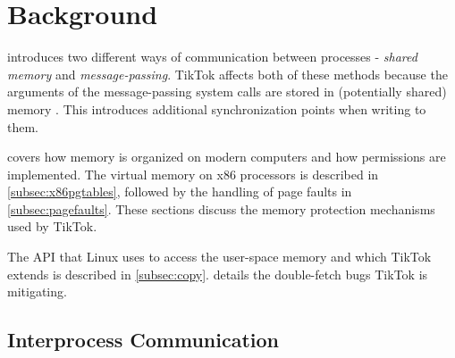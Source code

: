 \section{Background}
\label{sec:background}

 introduces two different ways of communication between
processes - \emph{shared memory} and \emph{message-passing}. TikTok affects both
of these methods because the arguments of the message-passing system calls are
stored in (potentially shared) memory . This introduces additional
synchronization points when writing to them. 

 covers how memory is organized on modern computers and how
permissions are implemented. The virtual memory on x86 processors is described
in \cref{subsec:x86pgtables}, followed by the handling of page faults in
\cref{subsec:pagefaults}. These sections discuss the memory protection
mechanisms used by TikTok.

The API that Linux uses to access the user-space memory and which TikTok extends is
described in \cref{subsec:copy}.  details the
double-fetch bugs TikTok is mitigating.

\subsection{Interprocess Communication}
\label{subsec:ipc}

